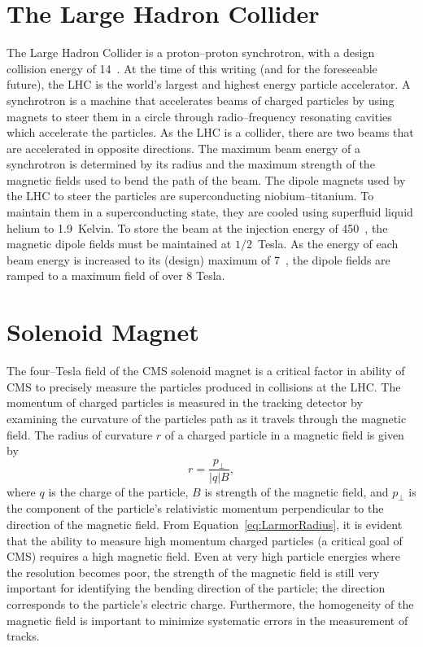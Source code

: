 \section{The Large Hadron Collider}
The Large Hadron Collider is a proton--proton synchrotron, with a design
collision energy of 14~\TeV.  At the time of this writing (and for the
foreseeable future), the LHC is the world's largest and highest energy particle
accelerator. A synchrotron is a machine that accelerates beams of charged
particles by using magnets to steer them in a circle through radio--frequency
resonating cavities which accelerate the particles. As the LHC is a collider,
there are two beams that are accelerated in opposite directions.  The maximum
beam energy of a synchrotron is determined by its radius and the maximum
strength of the magnetic fields used to bend the path of the beam.  The dipole
magnets used by the LHC to steer the particles are superconducting
niobium--titanium.  To maintain them in a superconducting state, they are cooled
using superfluid liquid helium to 1.9~Kelvin.  To store the beam at the
injection energy of 450~\GeV, the magnetic dipole fields must be maintained at
$1/2$~Tesla.  As the energy of each beam energy is increased to its (design)
maximum of 7~\TeV, the dipole fields are ramped to a maximum field of over 8
Tesla.
\section{Solenoid Magnet}
\label{sec:Magnet} The four--Tesla field of the CMS solenoid magnet is a critical
factor in ability of CMS to precisely measure the particles produced in
collisions at the LHC\@. The momentum of charged particles is measured in the
tracking detector by examining the curvature of the particles path as it travels
through the magnetic field.  The radius of curvature $r$ of a charged particle
in a magnetic field is given by
\begin{equation}
  r = \frac{p_\perp}{|q| B},
  \label{eq:LarmorRadius}
\end{equation}
where $q$ is the charge of the particle, $B$ is strength of the magnetic field,
and $p_\perp$ is the component of the particle's relativistic momentum
perpendicular to the direction of the magnetic field.  From
Equation~\ref{eq:LarmorRadius}, it is evident that the ability to measure high
momentum charged particles (a critical goal of CMS) requires a high magnetic
field.  Even at very high particle energies where the resolution becomes poor,
the strength of the magnetic field is still very important for identifying the
bending direction of the particle; the direction corresponds to the particle's
electric charge.  Furthermore, the homogeneity of the magnetic field is
important to minimize systematic errors in the measurement of tracks.

